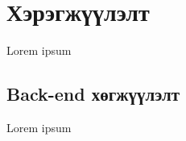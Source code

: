 \chapter{Хэрэгжүүлэлт}

Lorem ipsum

\section{Back-end хөгжүүлэлт}
\label{section:backeend}

Lorem ipsum

